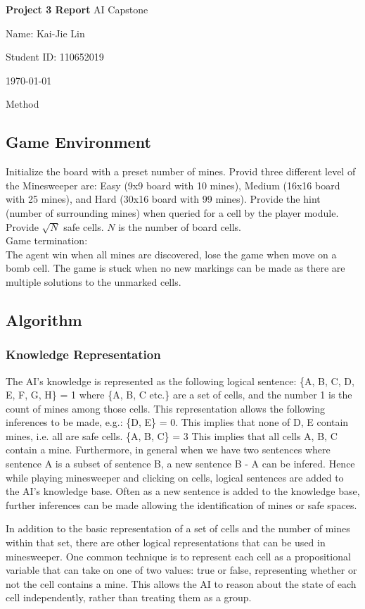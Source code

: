 \documentclass{article} %
\newcommand{\maketitletwo}[2][]{\begin{center}
        \Large{\textbf{Project 3 Report}
        AI Capstone} %
        \vspace{5pt}
        
        \normalsize{
            Name: Kai-Jie Lin 
            
            Student ID: 110652019
            
            \today}
        \vspace{15pt}
        \end{center}}
\begin{document}
\maketitletwo[5]  

\section{Method}
\subsection{Game Environment}
Initialize the board with a preset number of mines. Provid three different level of the Minesweeper are: 
Easy (9x9 board with 10 mines), Medium (16x16 board with 25 mines), and Hard (30x16 board with 99 mines).
Provide the hint (number of surrounding mines) when queried for a cell by the player module.
Provide $\sqrt{N}$ safe cells. $N$ is the number of board cells. \\
Game termination: \\
The agent win when all mines are discovered, lose the game when move on a bomb cell.
The game is stuck when no new markings can be made as there are multiple solutions to the unmarked cells.
\subsection{Algorithm}

\subsubsection*{Knowledge Representation} 
The AI's knowledge is represented as the following logical sentence:
\{A, B, C, D, E, F, G, H\} = 1
where \{A, B, C etc.\} are a set of cells, and the number 1 is the count of mines among those cells. This representation allows the following inferences to be made, e.g.:
\{D, E\} = 0. This implies that none of D, E contain mines, i.e. all are safe cells.
\{A, B, C\} = 3 This implies that all cells A, B, C contain a mine.
Furthermore, in general when we have two sentences where sentence A is a subset of sentence B, a new sentence B - A can be infered.
Hence while playing minesweeper and clicking on cells, logical sentences are added to the AI's knowledge base. 
Often as a new sentence is added to the knowledge base, further inferences can be made allowing the identification of mines or safe spaces.

In addition to the basic representation of a set of cells and the number of mines within that set, there are other logical representations that can be used in minesweeper. One common technique is to represent each cell as a propositional variable that can take on one of two values: true or false, representing whether or not the cell contains a mine. This allows the AI to reason about the state of each cell independently, rather than treating them as a group.
\end{document}
